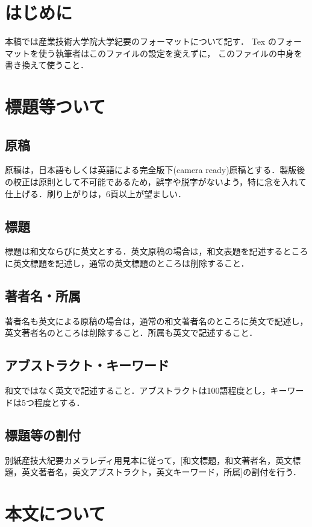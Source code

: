 \begin{multicols}{2}
\newpage
\section{はじめに}
本稿では産業技術大学院大学紀要のフォーマットについて記す．
Tex のフォーマットを使う執筆者はこのファイルの設定を変えずに，
このファイルの中身を書き換えて使うこと．

\section{標題等ついて}
\subsection{原稿}
原稿は，日本語もしくは英語による完全版下(camera ready)原稿とする．製版後の校正は原則として不可能であるため，誤字や脱字がないよう，特に念を入れて仕上げる．刷り上がりは，6頁以上が望ましい．

\subsection{標題}
標題は和文ならびに英文とする．英文原稿の場合は，和文表題を記述するところに英文標題を記述し，通常の英文標題のところは削除すること．

\subsection{著者名・所属}
著者名も英文による原稿の場合は，通常の和文著者名のところに英文で記述し，英文著者名のところは削除すること．所属も英文で記述すること．

\subsection{アブストラクト・キーワード}
和文ではなく英文で記述すること．アブストラクトは100語程度とし，キーワードは5つ程度とする．

\subsection{標題等の割付}
別紙産技大紀要カメラレディ用見本に従って，[和文標題，和文著者名，英文標
題，英文著者名，英文アブストラクト，英文キーワード，所属]の割付を行う．


\section{本文について}


\end{multicols}
